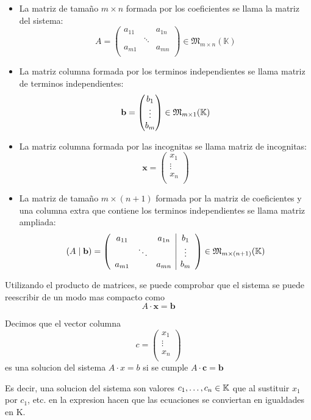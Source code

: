 \begin{itemize}
	\item La matriz de tamaño \(m \times n \) formada por los coeficientes se llama la matriz del sistema:
	      \[
		      A = \begin{pmatrix}
			      a_{11 } &        & a_{1n } \\
			              & \ddots &         \\
			      a_{m1 } &        & a_{mn}  \\
		      \end{pmatrix} \in \mathfrak{M}_{m \times n}(\mathbb{K})
	      \]
	\item La matriz columna formada por los terminos independientes se llama matriz de terminos independientes:
	      \[
		      \mathbf{b}  = \begin{pmatrix}
			      b_1    \\
			      \vdots \\
			      b_m    \\
		      \end{pmatrix} \in \mathfrak{\MakeUppercase{M}}_{m \times 1} (\K )
	      \]
	\item La matriz columna formada por las incognitas se llama matriz de incognitas:
	      \[
		      \mathbf{x}  = \begin{pmatrix}
			      x_1    \\
			      \vdots \\
			      x_n    \\
		      \end{pmatrix}
	      \]
	\item La matriz de tamaño \(m \times (n+1 )\) formada por la matriz de coeficientes y una columna extra que contiene los terminos independientes se llama matriz ampliada:
	      \[
		      (A\mid \mathbf{b} ) = \left ( \begin{array}{ccc|c}
				      a_{11} &        & a_{1n} & b_1    \\
				             & \ddots &        & \vdots \\
				      a_{m1} &        & a_{mn} & b_m
			      \end{array}\right )
		      \in \mathfrak{\MakeUppercase{M}}_{m \times (n + 1)}(\K)\]
\end{itemize}

Utilizando el producto de matrices, se puede comprobar que el sistema se puede reescribir de un modo mas compacto como
\[
	A \cdot \mathbf{x}  = \mathbf{b}
\]
\begin{definition}
	Decimos que el vector columna
	\[
		c = \begin{pmatrix}
			x_1    \\
			\vdots \\
			x_n    \\
		\end{pmatrix}
	\]
	es una solucion del sistema \(A \cdot x = b \) si se cumple \(A \cdot \mathbf{c}  = \mathbf{b} \)
\end{definition}
Es decir, una solucion del sistema son valores \(c_1, \ldots, c_n \in \mathbb{K} \) que al sustituir \(x_1 \) por \(c_1 \), etc. en la expresion hacen que las ecuaciones se conviertan en igualdades en K.

